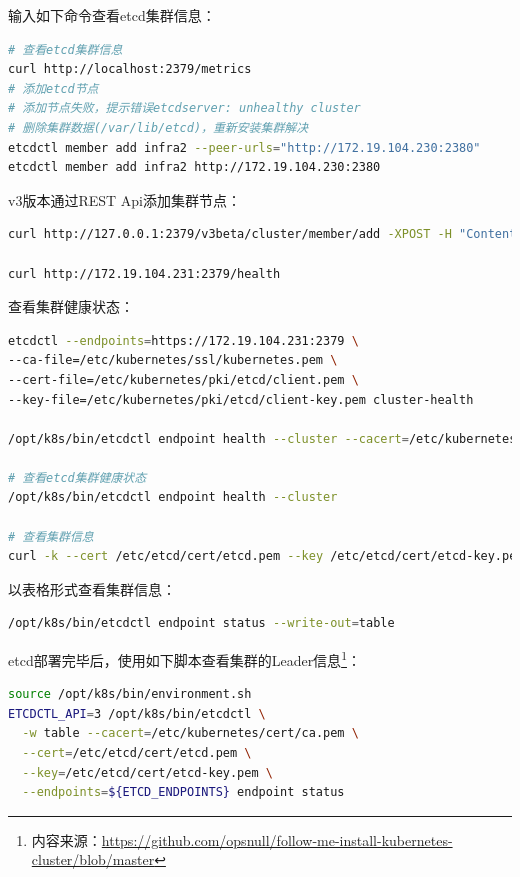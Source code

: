 \documentclass[8pt]{book}
\numberwithin{dummy}{section}
\theoremstyle{ocrenumbox}
\theoremstyle{blacknumex}
\theoremstyle{blacknumbox}
\theoremstyle{ocrenum}
\begin{document}
输入如下命令查看etcd集群信息：

\begin{lstlisting}[language=Bash]
# 查看etcd集群信息
curl http://localhost:2379/metrics
# 添加etcd节点
# 添加节点失败，提示错误etcdserver: unhealthy cluster
# 删除集群数据(/var/lib/etcd)，重新安装集群解决
etcdctl member add infra2 --peer-urls="http://172.19.104.230:2380"
etcdctl member add infra2 http://172.19.104.230:2380
\end{lstlisting}

v3版本通过REST Api添加集群节点：

\begin{lstlisting}[language=Bash]
curl http://127.0.0.1:2379/v3beta/cluster/member/add -XPOST -H "Content-Type: application/json" -d '{"peerURLs": ["http://172.19.104.230:2380"]}'

curl http://172.19.104.231:2379/health
\end{lstlisting}

查看集群健康状态：

\begin{lstlisting}[language=Bash]
etcdctl --endpoints=https://172.19.104.231:2379 \
--ca-file=/etc/kubernetes/ssl/kubernetes.pem \
--cert-file=/etc/kubernetes/pki/etcd/client.pem \
--key-file=/etc/kubernetes/pki/etcd/client-key.pem cluster-health

/opt/k8s/bin/etcdctl endpoint health --cluster --cacert=/etc/kubernetes/cert/ca.pem --cert=/etc/etcd/cert/etcd.pem --key=/etc/etcd/cert/etcd-key.pem

# 查看etcd集群健康状态
/opt/k8s/bin/etcdctl endpoint health --cluster

# 查看集群信息
curl -k --cert /etc/etcd/cert/etcd.pem --key /etc/etcd/cert/etcd-key.pem https://172.19.150.82:2379/metrics
\end{lstlisting}

以表格形式查看集群信息：

\begin{lstlisting}[language=Bash]
/opt/k8s/bin/etcdctl endpoint status --write-out=table
\end{lstlisting}

etcd部署完毕后，使用如下脚本查看集群的Leader信息\footnote{内容来源：\url{https://github.com/opsnull/follow-me-install-kubernetes-cluster/blob/master}}：

\begin{lstlisting}[language=Bash]
source /opt/k8s/bin/environment.sh
ETCDCTL_API=3 /opt/k8s/bin/etcdctl \
  -w table --cacert=/etc/kubernetes/cert/ca.pem \
  --cert=/etc/etcd/cert/etcd.pem \
  --key=/etc/etcd/cert/etcd-key.pem \
  --endpoints=${ETCD_ENDPOINTS} endpoint status
\end{lstlisting}
\end{document}
